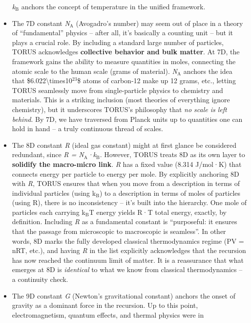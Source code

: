 \documentclass[]{article}
\newcommand{\subscript}[1]{\ensuremath{_{\mathrm{#1}}}}
\newcommand{\superscript}[1]{\ensuremath{^{\mathrm{#1}}}}
\begin{document}
\begin{itemize}
  \emph{k\subscript{B}}
  anchors the concept of temperature in the unified framework.
\item
  The 7D constant
  \emph{N\subscript{A}}
  (Avogadro's number) may seem out of place in a theory of
  ``fundamental'' physics -- after all, it's basically a counting unit
  -- but it plays a crucial role. By including a standard large number
  of particles, TORUS acknowledges \textbf{collective behavior and bulk
  matter}. At 7D, the framework gains the ability to measure quantities
  in moles, connecting the atomic scale to the human scale (grams of
  material).
  \emph{N\subscript{A}}
  anchors the idea that \$6.022\textbackslash{}times10\superscript{23}\$ atoms
  of carbon-12 make up 12 grams, etc., letting TORUS seamlessly move
  from single-particle physics to chemistry and materials. This is a
  striking inclusion (most theories of everything ignore chemistry), but
  it underscores TORUS's philosophy that \emph{no scale is left behind}.
  By 7D, we have traversed from Planck units up to quantities one can
  hold in hand -- a truly continuous thread of scales​.
\item
  The 8D constant \emph{R} (ideal gas constant) might at first glance be
  considered redundant, since \emph{R =
  N\subscript{A}·k\subscript{B}}.
  However, TORUS treats 8D as its own layer to \textbf{solidify the
  macro-micro link}. \emph{R} has a fixed value (8.314 J/mol·K) that
  connects energy per particle to energy per mole. By explicitly
  anchoring 8D with \emph{R}, TORUS ensures that when you move from a
  description in terms of individual particles (using
  k\subscript{B}) to a
  description in terms of moles of particles (using R), there is no
  inconsistency -- it's built into the hierarchy. One mole of particles
  each carrying
  k\subscript{B}T energy
  yields R·T total energy, exactly, by definition. Including \emph{R} as
  a fundamental constant is ``purposeful: it ensures that the passage
  from microscopic to macroscopic is seamless''​. In other words, 8D
  marks the fully developed classical thermodynamics regime (PV = nRT,
  etc.), and having \emph{R} in the list explicitly acknowledges that
  the recursion has now reached the continuum limit of matter. It is a
  reassurance that what emerges at 8D is \emph{identical} to what we
  know from classical thermodynamics -- a continuity check.
\item
  The 9D constant \emph{G} (Newton's gravitational constant) anchors the
  onset of gravity as a dominant force in the recursion. Up to this
  point, electromagnetism, quantum effects, and thermal physics were in

\end{itemize}
\end{document}

